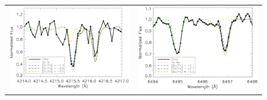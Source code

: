 \documentclass{emulateapj}
\begin{document}
\begin{figure}
 \begin{center}
  \begin{tabular}{cc}
  \includegraphics[width=8.5cm,clip=true,bbllx=80, bblly=362,bburx=558, bbury=705]{sr4215_synth.ps} & 
  \includegraphics[width=8.5cm,clip=true,bbllx=80, bblly=362,bburx=550, bbury=705]{ba6496_synth.ps} \\


\end{tabular}
\end{center}
\end{figure}
\end{document}
